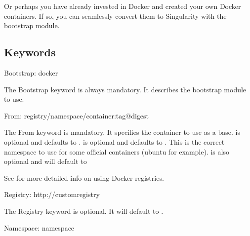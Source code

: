 \documentclass[letterpaper,10pt,english]{sphinxmanual}
\begin{document}
Or perhaps you have already invested in Docker and created your own Docker containers. If so, you can seamlessly convert them to
Singularity with the  bootstrap module.


\subsection{Keywords}
\label{\detokenize{appendix:keywords}}
%
\begin{sphinxVerbatim}[commandchars=\\\{\}]
Bootstrap: docker
\end{sphinxVerbatim}

The Bootstrap keyword is always mandatory. It describes the bootstrap module to use.

%
\begin{sphinxVerbatim}[commandchars=\\\{\}]
From: \PYGZlt{}registry\PYGZgt{}/\PYGZlt{}namespace\PYGZgt{}/\PYGZlt{}container\PYGZgt{}:\PYGZlt{}tag\PYGZgt{}@\PYGZlt{}digest\PYGZgt{}
\end{sphinxVerbatim}

The From keyword is mandatory. It specifies the container to use as a base.  is optional and defaults to .
 is optional and defaults to . This is the correct namespace to use for some official containers (ubuntu for example).
 is also optional and will default to 

See {\hyperref[\detokenize{singularity_and_docker:singularity-and-docker}]{}} for more detailed info on using Docker registries.

%
\begin{sphinxVerbatim}[commandchars=\\\{\}]
Registry: http://custom\PYGZus{}registry
\end{sphinxVerbatim}

The Registry keyword is optional. It will default to .

%
\begin{sphinxVerbatim}[commandchars=\\\{\}]
Namespace: namespace
\end{sphinxVerbatim}
\end{document}
